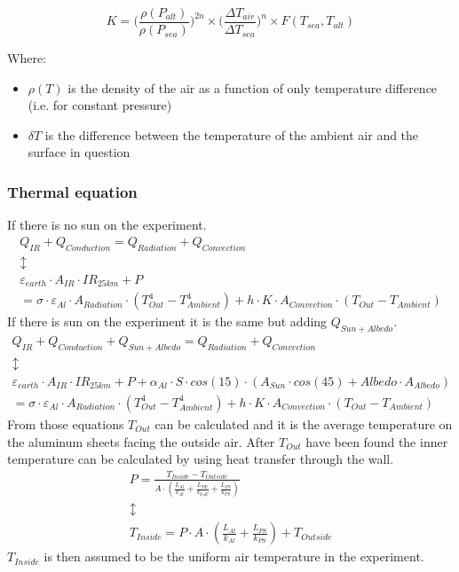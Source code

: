 \begin{equation*}
K = \Big(\frac{\rho(P_{alt})}{\rho(P_{sea})}\Big)^{2n}\times \Big(\frac{\Delta T_{air}}{\Delta T_{sea}}\Big)^{n}\times F(T_{sea}, T_{alt})
\end{equation*}

Where:
\begin{itemize}
    \item $\rho(T)$ is the density of the air as a function of only temperature difference (i.e. for constant pressure)
    \item $\delta T$ is the difference between the temperature of the ambient air and the surface in question
\end{itemize}




\raggedbottom


\subsubsection{Thermal equation}
If there is no sun on the experiment.
\begin{gather*}
    Q_{IR} + Q_{Conduction} = Q_{Radiation} + Q_{Convection} \\
    \updownarrow \\
    \varepsilon_{earth} \cdot A_{IR} \cdot IR_{25km} + P \\ = \sigma \cdot \varepsilon_{Al} \cdot A_{Radiation} \cdot (T_{Out}^4 - T_{Ambient}^4 ) + h \cdot K \cdot A_{Convection} \cdot (T_{Out} - T_{Ambient})
\end{gather*}
If there is sun on the experiment it is the same but adding $Q_{Sun+Albedo}$.
\begin{gather*}
    Q_{IR} + Q_{Conduction} + Q_{Sun+Albedo} = Q_{Radiation} + Q_{Convection} \\
    \updownarrow \\
    \varepsilon_{earth} \cdot A_{IR} \cdot IR_{25km} + P + \alpha_{Al}\cdot S \cdot cos(15) \cdot (A_{Sun} \cdot cos(45) + Albedo \cdot A_{Albedo}) \\ = \sigma \cdot \varepsilon_{Al} \cdot A_{Radiation} \cdot (T_{Out}^4 - T_{Ambient}^4 ) + h \cdot K \cdot A_{Convection} \cdot (T_{Out} - T_{Ambient})
\end{gather*}
From those equations $T_{Out}$ can be calculated and it is the average temperature on the aluminum sheets facing the outside air.
After $T_{Out}$ have been found the inner temperature can be calculated by using heat transfer through the wall.
\begin{gather*}
    P = \frac{T_{Inside} - T_{Outside}}{A \cdot (\frac{L_{Al}}{k_{Al}} + \frac{L_{PE}}{k_{k_PE}} + \frac{L_{PS}}{k_{PS}})} \\
     \updownarrow \\
    T_{Inside} = P \cdot A \cdot (\frac{L_{Al}}{k_{Al}} + \frac{L_{PS}}{k_{PS}}) + T_{Outside}
\end{gather*}
$T_{Inside}$ is then assumed to be the uniform air temperature in the experiment.



